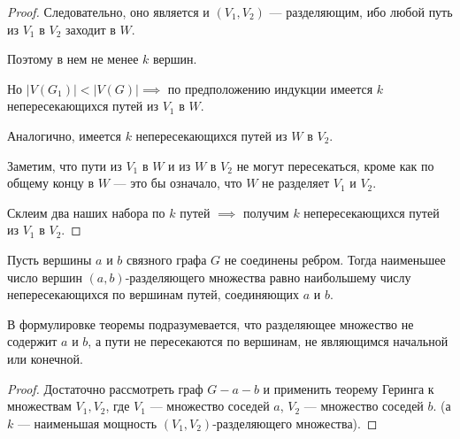 \begin{proof}
    Следовательно, оно является и $(V_1, V_2)$ --- разделяющим, ибо любой путь из $V_1$ в $V_2$ заходит в $W$.

    Поэтому в нем не менее $k$ вершин.

    Но $|V(G_1)| < |V(G)| \implies$ по предположению индукции имеется $k$ непересекающихся путей из $V_1$ в $W$.

    Аналогично, имеется $k$ непересекающихся путей из $W$ в $V_2$.

    Заметим, что пути из $V_1$ в $W$ и из $W$ в $V_2$ не могут пересекаться, кроме как по общему концу в $W$ --- это бы означало, что $W$ не разделяет $V_1$ и $V_2$.
    
    Склеим два наших набора по $k$ путей $\implies$ получим $k$ непересекающихся путей из $V_1$ в $V_2$.
\end{proof}

\begin{theorem}[Менгер, 1927]
    Пусть вершины $a$ и $b$ связного графа $G$ не соединены ребром. Тогда наименьшее число вершин $(a, b)$-разделяющего множества равно наибольшему числу непересекающихся по вершинам путей, соединяющих $a$ и $b$.

    В формулировке теоремы подразумевается, что разделяющее множество не содержит $a$ и $b$, а пути не пересекаются по вершинам, не являющимся начальной или конечной.
\end{theorem}

\begin{proof}
    Достаточно рассмотреть граф $G - a - b$ и применить теорему Геринга к множествам $V_1, V_2$, где $V_1$ --- множество соседей $a$, $V_2$ --- множество соседей $b$. (а $k$ --- наименьшая мощность $(V_1, V_2)$-разделяющего множества).
\end{proof}